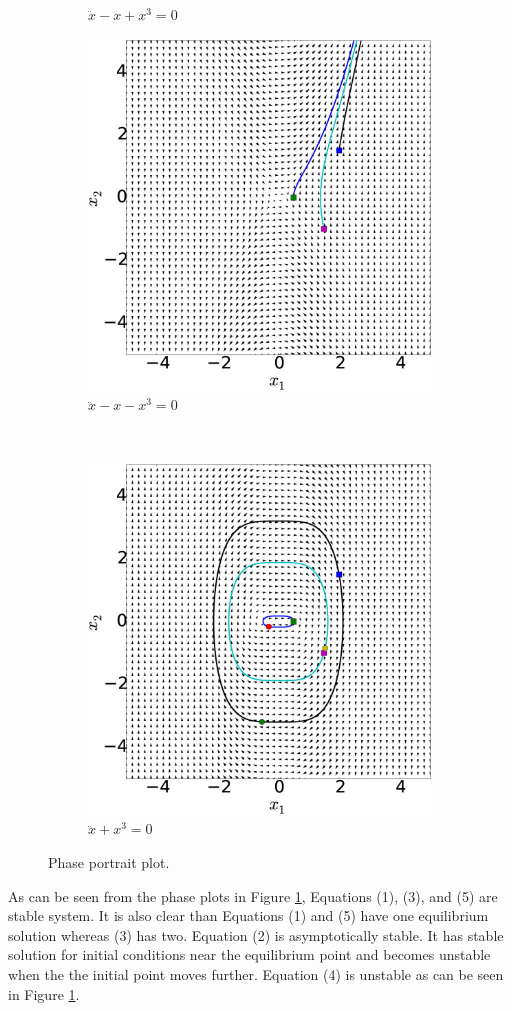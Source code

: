 \documentclass[12pt, a4paper]{extreport}
\begin{document}
\begin{figure}[H]
\begin{subfigure}[t]{7 cm}
        \caption{$\ddot{x} - x + x^3 = 0$}
    \end{subfigure}
    \quad
    \begin{subfigure}[t]{7 cm}
        \centering
        \includegraphics[height=7 cm]{figure/2D.eps}
        \caption{$\ddot{x} - x - x^3 = 0$}
    \end{subfigure}
    \\
    \begin{subfigure}[t]{7 cm}
        \centering
        \includegraphics[height=7 cm]{figure/2E.eps}
        \caption{$\ddot{x} + x^3 = 0$}
    \end{subfigure}
    \caption{Phase portrait plot.}
    \label{fig:phasePortrait}
\end{figure}
%
As can be seen from the phase plots in Figure \ref{fig:phasePortrait}, Equations (1), (3), and (5) are stable system. It is also clear than Equations (1) and (5) have one equilibrium solution whereas (3) has two. Equation (2) is asymptotically stable. It has stable solution for initial conditions near the equilibrium point and becomes unstable when the the initial point moves further. Equation (4) is unstable as can be seen in Figure \ref{fig:phasePortrait}.
\end{document}
